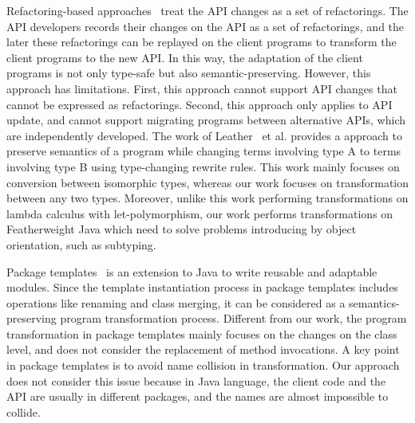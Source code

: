  Refactoring-based
approaches~\cite{reba, catchup} treat the API changes as a set of
refactorings. The API developers records their changes on the
API as a set of refactorings, and the later these refactorings can be
replayed on the client programs to transform the client programs to the new
API. In this way, the adaptation of the client programs is not only
type-safe but also semantic-preserving. However, this approach has
limitations. First, this approach cannot support API changes that
cannot be expressed as refactorings. Second, this approach only
applies to API update, and cannot support migrating programs between
alternative APIs, which are independently developed.
The work of Leather~\cite{pepm14} et al. provides a approach 
to preserve semantics 
of a program while changing terms involving type A to terms involving
type B using type-changing rewrite rules. This work mainly
focuses on conversion between isomorphic types, whereas our work focuses on
transformation between any two types. Moreover, unlike this work performing
transformations on lambda calculus with let-polymorphism, our work performs
transformations on Featherweight Java which need to solve problems introducing
by object orientation, such as subtyping.

Package templates~\cite{packtemp} is an extension to Java to write
reusable and adaptable modules. Since the template instantiation
process in package templates includes operations like renaming and
class merging, it can be considered as a semantics-preserving program
transformation process. Different from our work, the program
transformation in package templates mainly focuses on the changes on the
class level, and does not consider the replacement of method
invocations. A key point in package templates is to avoid name
collision in transformation. Our approach does not consider this issue
because in Java language, the client code and the API are usually in
different packages, and the names are almost impossible to collide.


